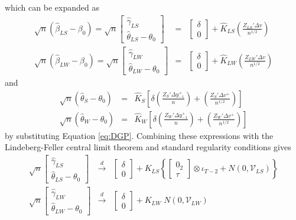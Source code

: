 which can be expanded as 
	\begin{eqnarray}
	\label{eq:distexpandLS}
		\sqrt{n}(\widehat{\beta}_{LS} - \beta_0) = \sqrt{n} \left[\begin{array}{l} \widehat{\gamma}_{LS}\\ \widehat{\theta}_{LS} - \theta_0\end{array}\right]   &=& \left[\begin{array}{c}\delta\\ 0\end{array}\right]+ \widehat{K}_{LS}\left(\frac{Z_{LS}'\Delta v}{n^{1/2}}\right)\\
						\sqrt{n}(\widehat{\beta}_{LW} - \beta_0) = \sqrt{n} \left[\begin{array}{l} \widehat{\gamma}_{LW}\\ \widehat{\theta}_{LW} - \theta_0\end{array}\right]   &=& \left[\begin{array}{c}\delta\\ 0\end{array}\right]+ \widehat{K}_{LW}\left(\frac{Z_{LW}'\Delta v}{n^{1/2}}\right)
\end{eqnarray}
and
\begin{eqnarray}
		\sqrt{n}\left(\widehat{\theta}_S -\theta_0\right)&=& \widehat{K}_S\left[\delta\left( \frac{Z_{S}'\Delta y_{-1}^+}{n}\right) + \left( \frac{Z_{S}'\Delta v^+}{n^{1/2}}\right)\right]\\
		\label{eq:distexpandW}
		\sqrt{n}\left(\widehat{\theta}_W-\theta_0\right) &=&  \widehat{K}_W\left[\delta\left( \frac{Z_{W}'\Delta y_{-1}^+}{n}\right) + \left( \frac{Z_{W}'\Delta v^+}{n^{1/2}}\right)\right]
	\end{eqnarray}
by substituting Equation \ref{eq:DGP}. Combining these expressions with the Lindeberg-Feller central limit theorem and standard regularity conditions gives
	\begin{eqnarray}
		\label{eq:dynpan1}
			\sqrt{n} \left[\begin{array}{l} \widehat{\gamma}_{LS}\\ \widehat{\theta}_{LS} - \theta_0\end{array}\right]   &\overset{d}{\rightarrow}& \left[\begin{array}{c}\delta\\ 0\end{array}\right] +K_{LS} \left\{ \left[\begin{array}{c}0_2\\ \tau \end{array}\right]\otimes \iota_{T-2} + N\left(0, \mathcal{V}_{LS}\right)\right\}\\
			\label{eq:dynpan2}
 			\sqrt{n} \left[\begin{array}{l} \widehat{\gamma}_{LW}\\ \widehat{\theta}_{LW} - \theta_0\end{array}\right]   &\overset{d}{\rightarrow}& \left[\begin{array}{c}\delta\\ 0\end{array}\right] +K_{LW}\; N\left(0, \mathcal{V}_{LW}\right)
	\end{eqnarray}
